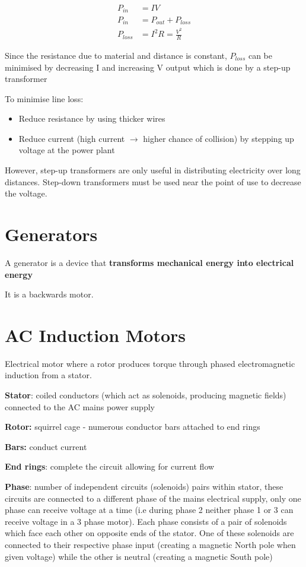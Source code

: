 	\begin{align*}
		P_{in} &= IV \\
		P_{in} &= P_{out} + P_{loss} \\
		P_{loss} &= I^2 R = \frac{V^2}{R}
	\end{align*}

	Since the resistance due to material and distance is constant, $P_{loss}$ can be minimised by decreasing I and increasing V output which is done by a step-up transformer

	To minimise line loss: 
	\begin{itemize}
		\item Reduce resistance by using thicker wires
		\item Reduce current (high current $\rightarrow$ higher chance of collision) by stepping up voltage at the power plant
	\end{itemize}

	However, step-up transformers are only useful in distributing electricity over long distances. Step-down transformers must be used near the point of use to decrease the voltage.

\section{Generators}

	A generator is a device that \textbf{transforms mechanical energy into electrical energy}

	It is a backwards motor.

\newpage

\section{AC Induction Motors}

	Electrical motor where a rotor produces torque through phased electromagnetic induction from a stator.

	\textbf{Stator}: coiled conductors (which act as solenoids, producing magnetic fields) connected to the AC mains power supply

	\textbf{Rotor:} squirrel cage - numerous conductor bars attached to end rings
		
		\textbf{Bars:} conduct current

		\textbf{End rings}: complete the circuit allowing for current flow

	\textbf{Phase}: number of independent circuits (solenoids) pairs within stator, these circuits are connected to a different phase of the mains electrical supply, only one phase can receive voltage at a time (i.e during phase 2 neither phase 1 or 3 can receive voltage in a 3 phase motor).
Each phase consists of a pair of solenoids which face each other on opposite ends of the stator. One of these solenoids are connected to their respective phase input (creating a magnetic North pole when given voltage) while the other is neutral (creating a magnetic South pole)

